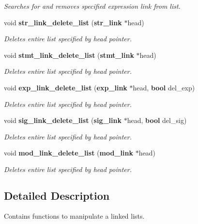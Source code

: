 \begin{CompactItemize}
\begin{CompactList}\small\item\em Searches for and removes specified expression link from list. \item\end{CompactList}\item 
void {\bf str\_\-link\_\-delete\_\-list} ({\bf str\_\-link} $\ast$head)
\begin{CompactList}\small\item\em Deletes entire list specified by head pointer. \item\end{CompactList}\item 
void {\bf stmt\_\-link\_\-delete\_\-list} ({\bf stmt\_\-link} $\ast$head)
\begin{CompactList}\small\item\em Deletes entire list specified by head pointer. \item\end{CompactList}\item 
void {\bf exp\_\-link\_\-delete\_\-list} ({\bf exp\_\-link} $\ast$head, {\bf bool} del\_\-exp)
\begin{CompactList}\small\item\em Deletes entire list specified by head pointer. \item\end{CompactList}\item 
void {\bf sig\_\-link\_\-delete\_\-list} ({\bf sig\_\-link} $\ast$head, {\bf bool} del\_\-sig)
\begin{CompactList}\small\item\em Deletes entire list specified by head pointer. \item\end{CompactList}\item 
void {\bf mod\_\-link\_\-delete\_\-list} ({\bf mod\_\-link} $\ast$head)
\begin{CompactList}\small\item\em Deletes entire list specified by head pointer. \item\end{CompactList}\end{CompactItemize}


\subsection{Detailed Description}
Contains functions to manipulate a linked lists. 

